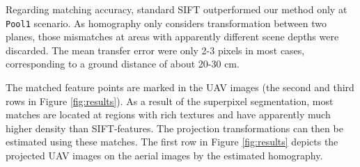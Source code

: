 

Regarding matching accuracy, standard SIFT outperformed our method only at \texttt{Pool1} scenario. 
As homography only considers transformation between two planes, those mismatches at areas with apparently different scene depths were discarded. 
The mean transfer error were only 2-3 pixels in most cases, corresponding to a ground distance of about 20-30 cm.  

The matched feature points are marked in the UAV images (the second and third rows in Figure \ref{fig:results}).
As a result of the superpixel segmentation, most matches are located at regions with rich textures and have apparently much higher density than SIFT-features. 
The projection transformations can then be estimated using these matches. 
The first row in Figure \ref{fig:results} depicts the projected UAV images on the aerial images by the estimated homography.

